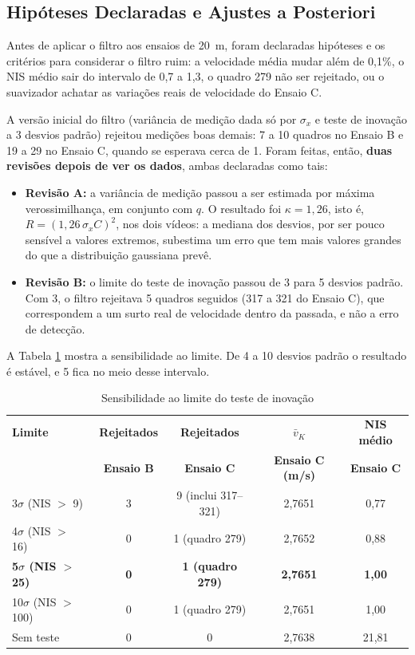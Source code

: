 \documentclass[
    12pt,               %
    openright,          %
    twoside,            %
    a4paper,            %
    chapter=TITLE,      %
    english,            %
    brazil              %
    ]{abntex2}
\begin{document}
\subsection{Hipóteses Declaradas e Ajustes a Posteriori}

Antes de aplicar o filtro aos ensaios de 20~m, foram declaradas hipóteses e os critérios para considerar o filtro ruim: a velocidade média mudar além de 0,1\%, o NIS médio sair do intervalo de 0,7 a 1,3, o quadro 279 não ser rejeitado, ou o suavizador achatar as variações reais de velocidade do Ensaio C.

A versão inicial do filtro (variância de medição dada só por $\sigma_x$ e teste de inovação a 3 desvios padrão) rejeitou medições boas demais: 7 a 10 quadros no Ensaio B e 19 a 29 no Ensaio C, quando se esperava cerca de 1. Foram feitas, então, \textbf{duas revisões depois de ver os dados}, ambas declaradas como tais:
\begin{itemize}
    \item \textbf{Revisão A:} a variância de medição passou a ser estimada por máxima verossimilhança, em conjunto com $q$. O resultado foi $\kappa = 1{,}26$, isto é, $R = (1{,}26\,\sigma_x C)^2$, nos dois vídeos: a mediana dos desvios, por ser pouco sensível a valores extremos, subestima um erro que tem mais valores grandes do que a distribuição gaussiana prevê.
    \item \textbf{Revisão B:} o limite do teste de inovação passou de 3 para 5 desvios padrão. Com 3, o filtro rejeitava 5 quadros seguidos (317 a 321 do Ensaio C), que correspondem a um surto real de velocidade dentro da passada, e não a erro de detecção.
\end{itemize}
A Tabela \ref{tab:sensibilidade} mostra a sensibilidade ao limite. De 4 a 10 desvios padrão o resultado é estável, e 5 fica no meio desse intervalo.

\begin{table}[H]
\centering
\small
\caption{Sensibilidade ao limite do teste de inovação}
\label{tab:sensibilidade}
\begin{tabular}{lcccc}
\hline
\textbf{Limite} & \textbf{Rejeitados} & \textbf{Rejeitados} & \textbf{$\bar{v}_K$} & \textbf{NIS médio} \\
 & \textbf{Ensaio B} & \textbf{Ensaio C} & \textbf{Ensaio C (m/s)} & \textbf{Ensaio C} \\
\hline
3$\sigma$ (NIS $>$ 9) & 3 & 9 (inclui 317--321) & 2,7651 & 0,77 \\
4$\sigma$ (NIS $>$ 16) & 0 & 1 (quadro 279) & 2,7652 & 0,88 \\
\textbf{5$\sigma$ (NIS $>$ 25)} & \textbf{0} & \textbf{1 (quadro 279)} & \textbf{2,7651} & \textbf{1,00} \\
10$\sigma$ (NIS $>$ 100) & 0 & 1 (quadro 279) & 2,7651 & 1,00 \\
Sem teste & 0 & 0 & 2,7638 & 21,81 \\
\hline
\end{tabular}
\end{table}
\end{document}
